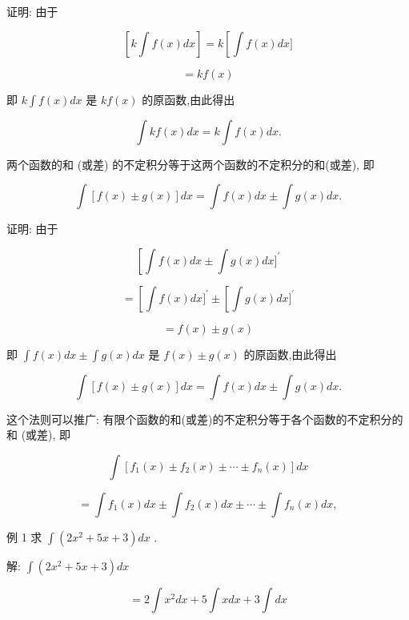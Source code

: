 \documentclass[lang=cn,newtx,12pt,scheme=chinese]{elegantbook}
\begin{document}
证明: 由于

\[
\left\lbrack {k\int f\left( x\right) {dx}}\right\rbrack = k\left\lbrack {\int f\left( x\right) {dx}\rbrack }\right.
\]

\[
= {kf}\left( x\right)
\]

即 \(k\int f\left( x\right) {dx}\) 是 \({kf}\left( x\right)\) 的原函数,由此得出

\[
\int {kf}\left( x\right) {dx} = k\int f\left( x\right) {dx}.
\]

\begin{proposition}[不定积分法则2]

两个函数的和 (或差) 的不定积分等于这两个函数的不定积分的和(或差), 即

\[
\int \left\lbrack {f\left( x\right) \pm g\left( x\right) }\right\rbrack {dx} = \int f\left( x\right) {dx} \pm \int g\left( x\right) {dx}.
\]

\end{proposition}

证明: 由于

\[
\left\lbrack {\int f\left( x\right) {dx} \pm \int g\left( x\right) {dx}{\rbrack }^{\prime }}\right.
\]

\[
= \left\lbrack {\int f\left( x\right) {dx}{\rbrack }^{\prime } \pm \left\lbrack {\int g\left( x\right) {dx}{\rbrack }^{\prime }}\right. }\right.
\]

\[
= f\left( x\right) \pm g\left( x\right)
\]

即 \(\int f\left( x\right) {dx} \pm \int g\left( x\right) {dx}\) 是 \(f\left( x\right) \pm g\left( x\right)\) 的原函数,由此得出

\[
\int \left\lbrack {f\left( x\right) \pm g\left( x\right) }\right\rbrack {dx} = \int f\left( x\right) {dx} \pm \int g\left( x\right) {dx}.
\]

这个法则可以推广: 有限个函数的和(或差)的不定积分等于各个函数的不定积分的和 (或差), 即

\[
\int \left\lbrack {{f}_{1}\left( x\right) \pm {f}_{2}\left( x\right) \pm \cdots \pm {f}_{n}\left( x\right) }\right\rbrack {dx}
\]

\[
= \int {f}_{1}\left( x\right) {dx} \pm \int {f}_{2}\left( x\right) {dx} \pm \cdots \pm \int {f}_{n}\left( x\right) {dx},
\]

例 1 求 \(\int \left( {2{x}^{2} + {5x} + 3}\right) {dx}\) .

解: \(\int \left( {2{x}^{2} + {5x} + 3}\right) {dx}\)

\[
= 2\int {x}^{2}{dx} + 5\int {xdx} + 3\int {dx}
\]
\end{document}
